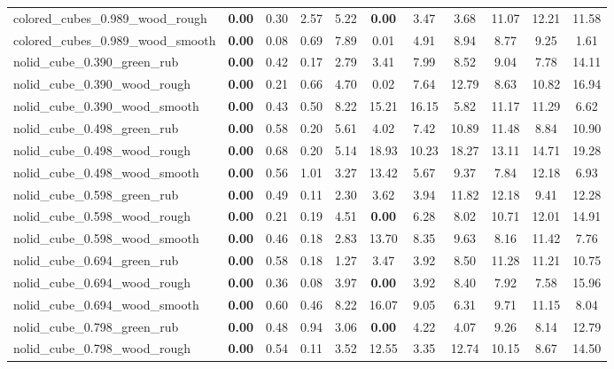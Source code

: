 \begin{table}[H]
{\begin{tabular}{l cccccccccc}
        colored\_cubes\_0.989\_wood\_rough & \textbf{0.00} & 0.30 & 2.57 & 5.22 & \textbf{0.00} & 3.47 & 3.68 & 11.07 & 12.21 & 11.58 \\
        colored\_cubes\_0.989\_wood\_smooth & \textbf{0.00} & 0.08 & 0.69 & 7.89 & 0.01 & 4.91 & 8.94 & 8.77 & 9.25 & 1.61 \\
        nolid\_cube\_0.390\_green\_rub & \textbf{0.00} & 0.42 & 0.17 & 2.79 & 3.41 & 7.99 & 8.52 & 9.04 & 7.78 & 14.11 \\
        nolid\_cube\_0.390\_wood\_rough & \textbf{0.00} & 0.21 & 0.66 & 4.70 & 0.02 & 7.64 & 12.79 & 8.63 & 10.82 & 16.94 \\
        nolid\_cube\_0.390\_wood\_smooth & \textbf{0.00} & 0.43 & 0.50 & 8.22 & 15.21 & 16.15 & 5.82 & 11.17 & 11.29 & 6.62 \\
        nolid\_cube\_0.498\_green\_rub & \textbf{0.00} & 0.58 & 0.20 & 5.61 & 4.02 & 7.42 & 10.89 & 11.48 & 8.84 & 10.90 \\
        nolid\_cube\_0.498\_wood\_rough & \textbf{0.00} & 0.68 & 0.20 & 5.14 & 18.93 & 10.23 & 18.27 & 13.11 & 14.71 & 19.28 \\
        nolid\_cube\_0.498\_wood\_smooth & \textbf{0.00} & 0.56 & 1.01 & 3.27 & 13.42 & 5.67 & 9.37 & 7.84 & 12.18 & 6.93 \\
        nolid\_cube\_0.598\_green\_rub & \textbf{0.00} & 0.49 & 0.11 & 2.30 & 3.62 & 3.94 & 11.82 & 12.18 & 9.41 & 12.28 \\
        nolid\_cube\_0.598\_wood\_rough & \textbf{0.00} & 0.21 & 0.19 & 4.51 & \textbf{0.00} & 6.28 & 8.02 & 10.71 & 12.01 & 14.91 \\
        nolid\_cube\_0.598\_wood\_smooth & \textbf{0.00} & 0.46 & 0.18 & 2.83 & 13.70 & 8.35 & 9.63 & 8.16 & 11.42 & 7.76 \\
        nolid\_cube\_0.694\_green\_rub & \textbf{0.00} & 0.58 & 0.18 & 1.27 & 3.47 & 3.92 & 8.50 & 11.28 & 11.21 & 10.75 \\
        nolid\_cube\_0.694\_wood\_rough & \textbf{0.00} & 0.36 & 0.08 & 3.97 & \textbf{0.00} & 3.92 & 8.40 & 7.92 & 7.58 & 15.96 \\
        nolid\_cube\_0.694\_wood\_smooth & \textbf{0.00} & 0.60 & 0.46 & 8.22 & 16.07 & 9.05 & 6.31 & 9.71 & 11.15 & 8.04 \\
        nolid\_cube\_0.798\_green\_rub & \textbf{0.00} & 0.48 & 0.94 & 3.06 & \textbf{0.00} & 4.22 & 4.07 & 9.26 & 8.14 & 12.79 \\
        nolid\_cube\_0.798\_wood\_rough & \textbf{0.00} & 0.54 & 0.11 & 3.52 & 12.55 & 3.35 & 12.74 & 10.15 & 8.67 & 14.50 \\

\end{tabular}}
\end{table}
